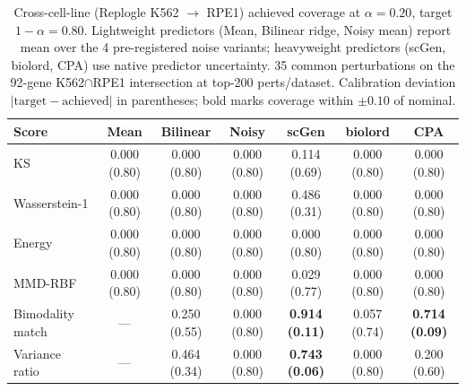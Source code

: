 \documentclass{article}
\begin{document}
\begin{table}[h]
\centering
\caption{Cross-cell-line (Replogle K562 $\rightarrow$ RPE1) achieved coverage at $\alpha = 0.20$, target $1 - \alpha = 0.80$. Lightweight predictors (Mean, Bilinear ridge, Noisy mean) report mean over the 4 pre-registered noise variants; heavyweight predictors (scGen, biolord, CPA) use native predictor uncertainty. 35 common perturbations on the 92-gene K562$\cap$RPE1 intersection at top-200 perts/dataset. Calibration deviation $|\text{target} - \text{achieved}|$ in parentheses; bold marks coverage within $\pm 0.10$ of nominal.}
\label{tab:xcl}
\begin{tabular}{lcccccc}
\toprule
Score & Mean & Bilinear & Noisy & scGen & biolord & CPA \\
\midrule
KS                  & 0.000 (0.80) & 0.000 (0.80) & 0.000 (0.80) & 0.114 (0.69) & 0.000 (0.80) & 0.000 (0.80) \\
Wasserstein-1       & 0.000 (0.80) & 0.000 (0.80) & 0.000 (0.80) & 0.486 (0.31) & 0.000 (0.80) & 0.000 (0.80) \\
Energy              & 0.000 (0.80) & 0.000 (0.80) & 0.000 (0.80) & 0.000 (0.80) & 0.000 (0.80) & 0.000 (0.80) \\
MMD-RBF             & 0.000 (0.80) & 0.000 (0.80) & 0.000 (0.80) & 0.029 (0.77) & 0.000 (0.80) & 0.000 (0.80) \\
Bimodality match    & ---          & 0.250 (0.55) & 0.000 (0.80) & \textbf{0.914 (0.11)} & 0.057 (0.74) & \textbf{0.714 (0.09)} \\
Variance ratio      & ---          & 0.464 (0.34) & 0.000 (0.80) & \textbf{0.743 (0.06)} & 0.000 (0.80) & 0.200 (0.60) \\
\bottomrule
\end{tabular}
\end{table}
\end{document}
